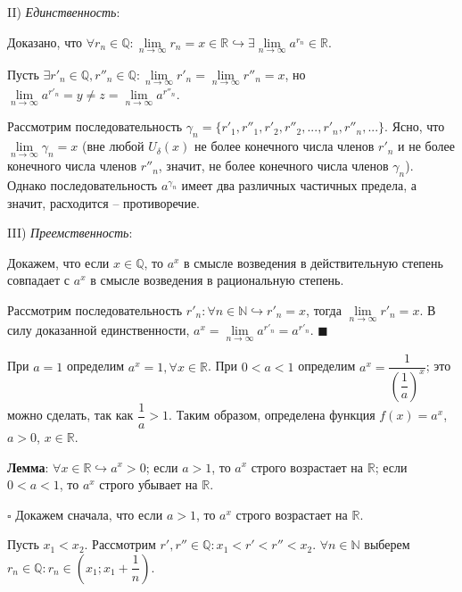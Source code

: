 \documentclass[12pt, a4paper, reqno]{article}
\begin{document}
    II) \textit{Единственность}:

    Доказано, что $\forall r_n\in\mathbb{Q}: \lim\limits_{n\to\infty} r_n = x\in\mathbb{R}
    \hookrightarrow \exists \lim\limits_{n\to\infty} a^{r_n}\in\mathbb{R}$.

    Пусть $\exists r'_n\in\mathbb{Q}, r''_n\in\mathbb{Q}: \lim\limits_{n\to\infty} r'_n =
    \lim\limits_{n\to\infty} r''_n = x$, но $\lim\limits_{n\to\infty} a^{r'_n} = y\neq z =
    \lim\limits_{n\to\infty} a^{r''_n}$.

    Рассмотрим последовательность $\gamma_n = \{r'_1, r''_1, r'_2, r''_2, ..., r'_n, r''_n, ...\}$.
    Ясно, что $\lim\limits_{n\to\infty} \gamma_n = x$ (вне любой $U_{\delta}(x)$ не более конечного
    числа членов $r'_n$ и не более конечного числа членов $r''_n$, значит, не более конечного числа
    членов $\gamma_n$). Однако последовательность $a^{\gamma_n}$ имеет два различных частичных
    предела, а значит, расходится -- противоречие.

    III) \textit{Преемственность}:

    Докажем, что если $x\in\mathbb{Q}$, то $a^x$ в смысле возведения в действительную степень
    совпадает с $a^x$ в смысле возведения в рациональную степень.

    Рассмотрим последовательность $r'_n: \forall n\in\mathbb{N}\hookrightarrow r'_n = x$, тогда
    $\lim\limits_{n\to\infty} r'_n = x$. В силу доказанной единственности, $a^x =
    \lim\limits_{n\to\infty} a^{r'_n} = a^{r'_n}$. $\blacksquare$

    При $a = 1$ определим $a^x = 1, \forall x\in\mathbb{R}$. При $0 < a < 1$ определим $a^x =
    \dfrac{1}{\left(\dfrac{1}{a}\right)^x}$; это можно сделать, так как $\dfrac{1}{a} > 1$. Таким
    образом, определена функция $f(x) = a^x$, $a > 0$, $x\in\mathbb{R}$.

    \textbf{Лемма}: $\forall x\in\mathbb{R}\hookrightarrow a^x > 0$; если $a > 1$, то $a^x$ строго
    возрастает на $\mathbb{R}$; если $0 < a < 1$, то $a^x$ строго убывает на $\mathbb{R}$.

    $\square$ Докажем сначала, что если $a > 1$, то $a^x$ строго возрастает на $\mathbb{R}$.

    Пусть $x_1 < x_2$. Рассмотрим $r', r''\in\mathbb{Q}: x_1 < r' < r'' < x_2$. $\forall n\in
    \mathbb{N}$ выберем $r_n\in\mathbb{Q}: r_n\in\left(x_1; x_1 + \dfrac{1}{n}\right)$.
\end{document}
